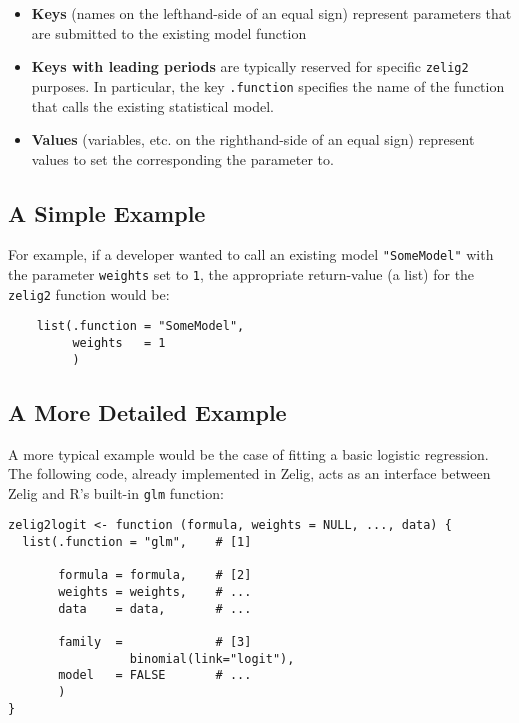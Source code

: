 \documentclass{article}
\newcommand{\code}[1]{{\tt #1}}
\begin{document}
\begin{itemize}

  \item {\bf Keys} (names on the lefthand-side of an equal sign) represent
        parameters that are submitted to the existing model function
        
  \item {\bf Keys with leading periods} are typically reserved for specific
        \code{zelig2} purposes. In particular, the key \code{.function}
        specifies the name of the function that calls the existing statistical
        model.
  
  \item {\bf Values} (variables, etc. on the righthand-side of an equal sign)
        represent values to set the corresponding the parameter to.

\end{itemize}

\subsection{A Simple Example}

\noindent For example, if a developer wanted to call an existing model
\code{"SomeModel"} with the parameter \code{weights} set to \code{1},
the appropriate return-value (a list) for the \code{zelig2} function would be:


\begin{verbatim}
    list(.function = "SomeModel",
         weights   = 1
         )
\end{verbatim}


\subsection{A More Detailed Example}

\noindent A more typical example would be the case of fitting a basic logistic
regression. The following code, already implemented in Zelig, acts as an
interface between Zelig and R's built-in \code{glm} function:


\begin{verbatim}
zelig2logit <- function (formula, weights = NULL, ..., data) {
  list(.function = "glm",    # [1]
       
       formula = formula,    # [2]
       weights = weights,    # ...
       data    = data,       # ...

       family  =             # [3]
                 binomial(link="logit"),
       model   = FALSE       # ...
       )
}
\end{verbatim}
\end{document}
